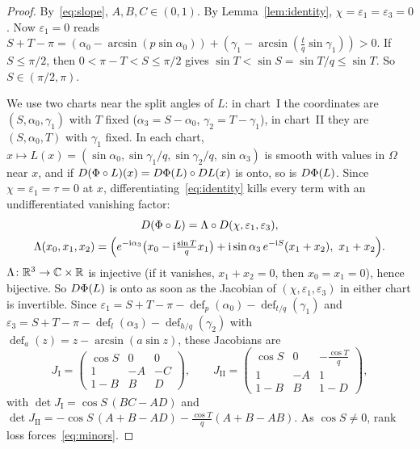\begin{proof}
By~\eqref{eq:slope}, $A,B,C\in(0,1)$. By Lemma~\ref{lem:identity},
$\chi=\varepsilon_1=\varepsilon_3=0$. Now $\varepsilon_1=0$ reads
$S+T-\pi=(\alpha_0-\arcsin(p\sin\alpha_0))+(\gamma_1-\arcsin(\frac tq\sin\gamma_1))>0$.
If $S\le\pi/2$, then $0<\pi-T<S\le\pi/2$ gives
$\sin T<\sin S=\sin T/q\le\sin T$. So $S\in(\pi/2,\pi)$.

We use two charts near the split angles of $L$: in chart~I the coordinates are
$(S,\alpha_0,\gamma_1)$ with $T$ fixed ($\alpha_3=S-\alpha_0$,
$\gamma_2=T-\gamma_1$), in chart~II they are $(S,\alpha_0,T)$ with $\gamma_1$
fixed. In each chart, $x\mapsto L(x)=(\sin\alpha_0,\sin\gamma_1/q,\sin\gamma_2/q,\sin\alpha_3)$
is smooth with values in $\Omega$ near $x$, and if
$D(\Phi\circ L)(x)=D\Phi(L)\circ DL(x)$ is onto, so is $D\Phi(L)$. Since
$\chi=\varepsilon_1=\tau=0$ at $x$, differentiating~\eqref{eq:identity} kills
every term with an undifferentiated vanishing factor:
\begin{gather*}
  D(\Phi\circ L)=\Lambda\circ D(\chi,\varepsilon_1,\varepsilon_3),\\
  \Lambda(x_0,x_1,x_2)=\Bigl(e^{-\mathrm{i}\alpha_3}\bigl(x_0-\mathrm{i}\tfrac{\sin T}{q}x_1\bigr)
  +\mathrm{i}\sin\alpha_3\,e^{-\mathrm{i} S}(x_1+x_2),\ x_1+x_2\Bigr).
\end{gather*}
$\Lambda\colon\mathbb{R}^3\to\mathbb{C}\times\mathbb{R}$ is injective (if it vanishes, $x_1+x_2=0$, then
$x_0=x_1=0$), hence bijective. So $D\Phi(L)$ is onto as soon as the Jacobian
of $(\chi,\varepsilon_1,\varepsilon_3)$ in either chart is invertible. Since
$\varepsilon_1=S+T-\pi-\operatorname{def}_p(\alpha_0)-\operatorname{def}_{t/q}(\gamma_1)$
and
$\varepsilon_3=S+T-\pi-\operatorname{def}_l(\alpha_3)-\operatorname{def}_{h/q}(\gamma_2)$
with $\operatorname{def}_a(z)=z-\arcsin(a\sin z)$, these Jacobians are
\[
  J_{\mathrm I}=\begin{pmatrix}\cos S&0&0\\ 1&-A&-C\\ 1-B&B&D\end{pmatrix},
  \qquad
  J_{\mathrm{II}}=\begin{pmatrix}\cos S&0&-\frac{\cos T}{q}\\ 1&-A&1\\ 1-B&B&1-D\end{pmatrix},
\]
with $\det J_{\mathrm I}=\cos S\,(BC-AD)$ and
$\det J_{\mathrm{II}}=-\cos S\,(A+B-AD)-\frac{\cos T}{q}(A+B-AB)$. As
$\cos S\ne0$, rank loss forces~\eqref{eq:minors}.
\end{proof}

